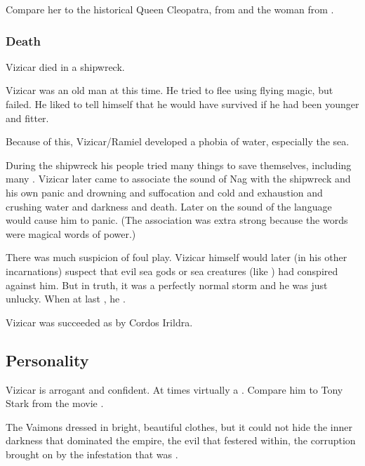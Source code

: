 Compare her to the historical Queen Cleopatra, \PhedreNoDelaunay from \cite{JacquelineCarey:KushielsLegacy} and the woman from \cite{MaelMordha:GealtachtMaelMordha}. 





\subsubsection{Death}
Vizicar died in a shipwreck.

Vizicar was an old man at this time. 
He tried to flee using flying magic, but failed. 
He liked to tell himself that he would have survived if he had been younger and fitter. 

Because of this, Vizicar/Ramiel developed a phobia of water, especially the sea.

During the shipwreck his people tried many things to save themselves, including many . 
Vizicar later came to associate the sound of Nag with the shipwreck and his own panic and drowning and suffocation and cold and exhaustion and crushing water and darkness and death. 
Later on the sound of the language would cause him to panic.
(The association was extra strong because the words were magical words of power.)

There was much suspicion of foul play. 
Vizicar himself would later (in his other incarnations) suspect that evil sea gods or sea creatures (like \nagae) had conspired against him. 
But in truth, it was a perfectly normal storm and he was just unlucky.
When at last , he . 

Vizicar was succeeded as \VaimonCaliph by Cordos Irildra. 









\subsection{Personality}
Vizicar is arrogant and confident. 
At times virtually a . 
Compare him to Tony Stark from the movie \cite{Movie:IronMan}. 

The Vaimons dressed in bright, beautiful clothes, but it could not hide the inner darkness that dominated the empire, the evil that festered within, the corruption brought on by the infestation that was \iquin. 

